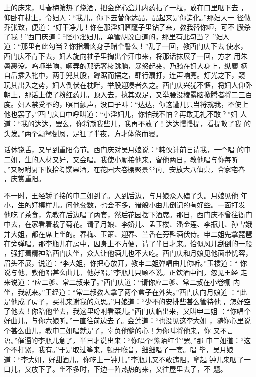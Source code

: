 上的床来，叫春梅筛热了烧酒，把金穿心盒儿内药拈了一粒，放在口里咽下去
，仰卧在枕上，令妇人：“我儿，你下去替你达品，品起来是你造化。”那妇人一
径做乔张致，便道：“好干净儿！你在那淫妇窟窿子里钻了来，教我替你咂，可不
臜杀了我！”西门庆道：“怪小淫妇儿，单管胡说白道的，那里有此勾当？
”妇人道：“那里有此勾当？你指着肉身子赌个誓么！”乱了一回，教西门庆下去
使水，西门庆不肯下去，妇人旋向袖子里掏出个汗巾来，将那话抹展了一回，方才
用朱唇裹没。呜咂半晌，咂弄的那话奢棱跳脑，暴怒起来，乃骑在妇人身上，纵麈
柄自后插入牝中，两手兜其股，蹲踞而摆之，肆行扇打，连声响亮。灯光之下，窥
玩其出入之势，妇人倒伏在枕畔，举股迎凑者久之。西门庆兴犹不惬，将妇人仰卧
朝上，那话上使了粉红药儿，顶入去，执其双足，又举腰没棱露脑掀腾者将二三百
度。妇人禁受不的，瞑目颤声，没口子叫：“达达，你这遭儿只当将就我，不使上
他也罢了。”西门庆口中呼叫道：“小淫妇儿，你怕我不怕？再敢无礼不敢？”妇
人道：“我的达达，罢么，你将就我些儿，我再不敢了！达达慢慢提，看提散了我
的头发。”两个颠鸳倒凤，足狂了半夜，方才体倦而寝。

话休饶舌，又早到重阳令节。西门庆对吴月娘说：“韩伙计前日请我，一个唱
的申二姐，生的人材又好，又会唱。我使小厮接他来，留他两日，教他唱与你每听
。”又吩咐厨下收拾肴馔果酒，在花园大卷棚聚景堂内，安放大八仙桌，合家宅眷
，庆赏重阳。

不一时，王经轿子接的申二姐到了。入到后边，与月娘众人磕了头。月娘见他
年小，生的好模样儿。问他套数，也会不多，诸般小曲儿倒记的有好些。一面打发
他吃了茶食，先教在后边唱了两套，然后花园摆下酒席。那日，西门庆不曾往衙门
中去，在家看着栽了菊花。请了月娘、李娇儿、孟玉楼、潘金莲、李瓶儿、孙雪娥
并大姐，都在席上坐的。春梅、玉箫、迎春、兰香在旁斟酒伏侍。申二姐先拿琵琶
在旁弹唱。那李瓶儿在房中，因身上不方便，请了半日才来。恰似风儿刮倒的一般
，强打着精神陪西门庆坐，众人让他酒儿也不大吃。西门庆和月娘见他面带忧容，
眉头不展，说道：“李大姐，你把心放开，教申二姐弹唱曲儿你听。”玉楼道：“
你说与他，教他唱甚么曲儿，他好唱。”李瓶儿只顾不说。正饮酒中间，忽见王经
走来说道：“应二爹、常二叔来了。”西门庆道：“请你应二爹、常二叔在小卷棚
内坐，我就来。”王经道：“常二叔教人拿了两个盒子在外头。”西门庆向月娘道
：“此是他成了房子，买礼来谢我的意思。”月娘道：“少不的安排些甚么管待他
，怎好空了他去！你陪他坐去，我这里吩咐看菜儿。”西门庆临出来，又叫申二姐
：“你唱个好曲儿，与你六娘听。”一直往前边去了。金莲道：“也没见这李大姐
，随你心里说个甚么曲儿，教申二姐唱就是了，辜负他爹的心！为你叫将他来，你
又不言语。”催逼的李瓶儿急了，半日才说出来：“你唱个‘紫陌红尘’罢。”那
申二姐道：“这个不打紧，我有。”于是取过筝来，顿开喉音，细细唱了一套。唱
毕，吴月娘道：“李大姐，好甜酒儿，你吃上一钟儿。”李瓶儿又不敢违阻，拿起
钟儿来咽了一口儿，又放下了。坐不多时，下边一阵热热的来，又往屋里去了，不
题。


